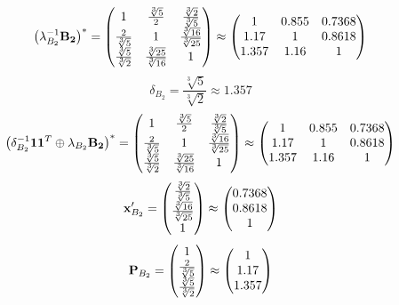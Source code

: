 \documentclass[10pt,a4paper]{article}
\begin{document}
	\[
		\left(\lambda_{B_2}^{-1}\bold{B_2}\right)^* = 
		\begin{pmatrix}
			{1} {} & \frac{\sqrt[3]{5}} {{2}} & \frac{\sqrt[3]{2}} {\sqrt[3]{5}} \\
			\frac{{2}} {\sqrt[3]{5}} & {1} {} & \frac{\sqrt[3]{16}} {\sqrt[3]{25}} \\
			\frac{\sqrt[3]{5}} {\sqrt[3]{2}} & \frac{\sqrt[3]{25}} {\sqrt[3]{16}} & {1} {} \\
		\end{pmatrix}
		\approx
		\begin{pmatrix}
			1        & 0.855    & 0.7368   \\
			1.17     & 1        & 0.8618   \\
			1.357    & 1.16     & 1        \\
		\end{pmatrix}
	\]
	\[
		\delta_{B_2} = \frac{\sqrt[3]{5}} {\sqrt[3]{2}}\approx 1.357
	\]
	\[
		\left(\delta_{B_2}^{-1}\bold{11}^T \oplus \lambda_{B_2}\bold{B_2}\right)^* = 
		\begin{pmatrix}
			{1} {} & \frac{\sqrt[3]{5}} {{2}} & \frac{\sqrt[3]{2}} {\sqrt[3]{5}} \\
			\frac{{2}} {\sqrt[3]{5}} & {1} {} & \frac{\sqrt[3]{16}} {\sqrt[3]{25}} \\
			\frac{\sqrt[3]{5}} {\sqrt[3]{2}} & \frac{\sqrt[3]{25}} {\sqrt[3]{16}} & {1} {} \\
		\end{pmatrix}
		\approx
		\begin{pmatrix}
			1        & 0.855    & 0.7368   \\
			1.17     & 1        & 0.8618   \\
			1.357    & 1.16     & 1        \\
		\end{pmatrix}
	\]
	\[
		\bold{x}'_{B_2} = 
		\begin{pmatrix}
			\frac{\sqrt[3]{2}} {\sqrt[3]{5}} \\
			\frac{\sqrt[3]{16}} {\sqrt[3]{25}} \\
			{1} {} \\
		\end{pmatrix}
		\approx
		\begin{pmatrix}
			0.7368   \\
			0.8618   \\
			1        \\
		\end{pmatrix}
	\]
	\[
		\bold{P}_{B_2} = 
		\begin{pmatrix}
			{1} {} \\
			\frac{{2}} {\sqrt[3]{5}} \\
			\frac{\sqrt[3]{5}} {\sqrt[3]{2}} \\
		\end{pmatrix}
		\approx
		\begin{pmatrix}
			1        \\
			1.17     \\
			1.357    \\
		\end{pmatrix}
	\]
\end{document}
